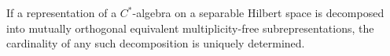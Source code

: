 If a representation of a $C^*$-algebra on a separable Hilbert space is decomposed into mutually orthogonal equivalent multiplicity-free subrepresentations, the cardinality of any such decomposition is uniquely determined.
